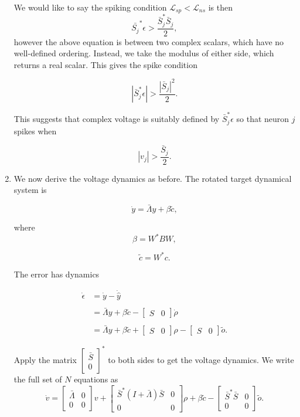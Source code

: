 \begin{enumerate}
We would like to say the spiking condition $\mathcal{L}_{sp} < \mathcal{L}_{ns}$ is then
$$
\bar{S_j}^*\epsilon > \frac{\bar{S}_j^* \bar{S}_j}{2},
$$
however the above equation is between two complex scalars, which have no well-defined ordering. Instead, we take the modulus of either side, which returns a real scalar. This gives the spike condition

$$
|\bar{S}_j^*\epsilon| > \frac{|\bar{S}_j|^2}{2}.
$$
	
This suggests that complex voltage is suitably defined by $\bar{S}_j^*\epsilon$ so that neuron $j$ spikes when 

$$
|v_j| > \frac{\bar{S}_j}{2}.
$$



\clearpage

\item We now derive the voltage dynamics as before. The rotated target dynamical system is

$$
\dot{y} = \bar{\Lambda} y + \beta \tilde{c},
$$

where 
$$
\beta = W^* B W,
$$

$$
\tilde{c} = W^* c.
$$

The error has dynamics

\begin{align*}
\dot{\epsilon} &= \dot{y} - \dot{\hat{y}}
\\
\\
&=
\bar{\Lambda}y + \beta \tilde{c} - \begin{bmatrix}
S & 0
\end{bmatrix}
\dot{\rho}
\\
\\
&= 
\bar{\Lambda}y + \beta \tilde{c}
+
\begin{bmatrix}
S & 0
\end{bmatrix}
\rho
-
\begin{bmatrix}
S & 0
\end{bmatrix}
\tilde{o}.
\end{align*}


Apply the matrix $\begin{bmatrix}
\bar{S} \\ 0
\end{bmatrix}^*$ to both sides to get the voltage dynamics. We write the full set of $N$ equations as
$$
\dot{v} = 
\begin{bmatrix}
\bar{\Lambda} & 0 \\ 0 & 0
\end{bmatrix}
v
+
\begin{bmatrix}
\bar{S}^*\left(I + \bar{\Lambda}\right) \bar{S}  & 0 \\ 0 & 0
\end{bmatrix} \rho 
+
\beta \tilde{c}
-
\begin{bmatrix}
\bar{S}^* \bar{S} &  0 \\ 0 & 0
\end{bmatrix} \tilde{o}.
$$


 
\end{enumerate}

